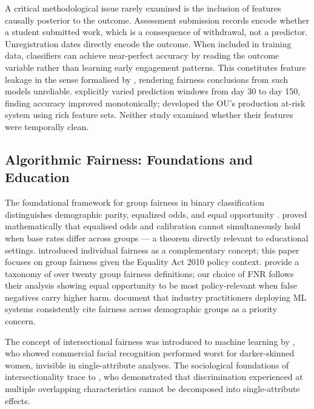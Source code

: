 \documentclass[12pt,a4paper]{article}
\begin{document}
A critical methodological issue rarely examined is the inclusion of
features causally posterior to the outcome. Assessment submission records
encode whether a student submitted work, which is a consequence of
withdrawal, not a predictor. Unregistration dates directly encode the outcome.
When included in training data, classifiers can achieve near-perfect accuracy
by reading the outcome variable rather than learning early engagement
patterns. This constitutes feature leakage in the sense formalised by
\citet{kaufman2012}, rendering fairness conclusions from such models
unreliable. \citet{idowu2024} explicitly varied prediction windows from day 30
to day 150, finding accuracy improved monotonically; \citet{hlosta2017}
developed the OU's production at-risk system using rich feature sets. Neither
study examined whether their features were temporally clean.

\subsection{Algorithmic Fairness: Foundations and Education}

The foundational framework for group fairness in binary classification
distinguishes demographic parity, equalized odds, and equal opportunity
\citep{hardt2016}. \citet{chouldechova2017} proved mathematically that
equalised odds and calibration cannot simultaneously hold when base rates
differ across groups --- a theorem directly relevant to educational settings.
\citet{dwork2012} introduced individual fairness as a complementary concept;
this paper focuses on group fairness given the Equality Act 2010
\citep{equalityact2010} policy context. \citet{verma2018} provide a taxonomy
of over twenty group fairness definitions; our choice of FNR follows their
analysis showing equal opportunity to be most policy-relevant when false
negatives carry higher harm. \citet{holstein2019} document that industry
practitioners deploying ML systems consistently cite fairness across
demographic groups as a priority concern.

The concept of intersectional fairness was introduced to machine learning by
\citet{buolamwini2018}, who showed commercial facial recognition performed
worst for darker-skinned women, invisible in single-attribute analyses. The
sociological foundations of intersectionality trace to \citet{crenshaw1989},
who demonstrated that discrimination experienced at multiple overlapping
characteristics cannot be decomposed into single-attribute effects.
\end{document}
